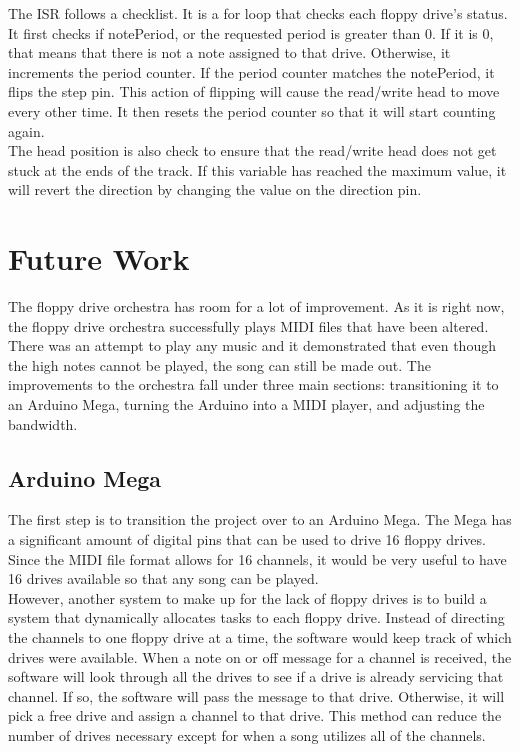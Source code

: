 \documentclass[11pt, a4paper]{report}
\begin{document}
\pagebreak
The ISR follows a checklist. It is a for loop that checks each floppy drive's status. It first checks if notePeriod, or the requested period is greater than 0. If it is 0, that means that there is not a note assigned to that drive. Otherwise, it increments the period counter. If the period counter matches the notePeriod, it flips the step pin. This action of flipping will cause the read/write head to move every other time. It then resets the period counter so that it will start counting again. \\ 

The head position is also check to ensure that the read/write head does not get stuck at the ends of the track. If this variable has reached the maximum value, it will revert the direction by changing the value on the direction pin.



\chapter{Future Work}

The floppy drive orchestra has room for a lot of improvement. As it is right now, the floppy drive orchestra successfully plays MIDI files that have been altered. There was an attempt to play any music and it demonstrated that even though the high notes cannot be played, the song can still be made out. The improvements to the orchestra fall under three main sections: transitioning it to an Arduino Mega, turning the Arduino into a MIDI player, and adjusting the bandwidth.\\

\section{Arduino Mega}
The first step is to transition the project over to an Arduino Mega. The Mega has a significant amount of digital pins that can be used to drive 16 floppy drives. Since the MIDI file format allows for 16 channels, it would be very useful to have 16 drives available so that any song can be played. \\

However, another system to make up for the lack of floppy drives is to build a system that dynamically allocates tasks to each floppy drive. Instead of directing the channels to one floppy drive at a time, the software would keep track of which drives were available. When a note on or off message for a channel is received, the software will look through all the drives to see if a drive is already servicing that channel. If so, the software will pass the message to that drive. Otherwise, it will pick a free drive and assign a channel to that drive. This method can reduce the number of drives necessary except for when a song utilizes all of the channels. \\
\end{document}

